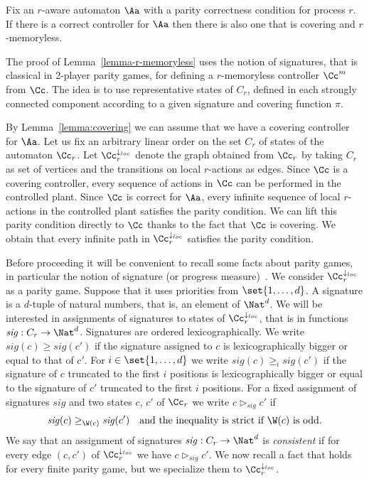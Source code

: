 \documentclass[10pt,a4paper]{article}
\newcommand{\sgt}{\vartriangleright_\sig}
\newcommand{\Ccloc}{\Cc^{\dar_{loc}}}
\newcommand{\sig}{\mathit{sig}}
\newcommand{\dar}{\downarrow}
\begin{document}
\begin{lemma}\label{lemma-r-memoryless}
  Fix an $r$-aware automaton $\Aa$ with a parity correctness condition
  for process $r$. 
  If there is a correct controller for $\Aa$ then there is
  also one that is covering and $r$-memoryless.
\end{lemma}




The proof of Lemma~\ref{lemma-r-memoryless} uses the notion of
  signatures, that is classical in 2-player parity games, for defining
  a $r$-memoryless controller $\Cc^m$ from $\Cc$. The idea is to use
  representative states of $C_r$, defined in each strongly connected
  component according to a given signature and covering function
  $\pi$.

By Lemma~\ref{lemma:covering} we can assume that we have a covering
controller for $\Aa$. Let us fix an arbitrary
linear order on the set $C_r$ of states of the automaton $\Cc_r$. Let
$\Ccloc_r$ denote the graph obtained from $\Cc_r$ by taking $C_r$ as
set of vertices and the transitions on local $r$-actions as
edges. Since $\Cc$ is a covering controller, every sequence of actions
in $\Cc$ can be performed in the controlled plant. Since $\Cc$ is
correct for $\Aa$, every
infinite sequence of local $r$-actions in the controlled plant
satisfies the parity condition. We can lift this parity condition
directly to $\Cc$ thanks to the fact that $\Cc$ is covering. We obtain
that every infinite path in $\Ccloc_r$ satisfies the parity condition.

  Before proceeding it will be convenient to recall some facts about
  parity games, in particular the notion of
  signature (or progress measure)~\cite{wal01ic}. We consider $\Ccloc_r$ as a
  parity game. Suppose that it uses priorities from
  $\set{1,\dots,d}$. A signature is a $d$-tuple of natural numbers,
  that is, an element of $\Nat^d$. We will be interested in
  assignments of signatures to states of $\Ccloc_r$, that is in
  functions $\sig:C_r\to\Nat^d$. Signatures are ordered
  lexicographically. We write $\sig(c)\geq \sig(c')$ if the signature
  assigned to $c$ is lexicographically bigger or equal to that of
  $c'$. For $i\in\set{1,\dots,d}$ we write $\sig(c)\geq_i \sig(c')$ if
  the signature of $c$ truncated to the first $i$ positions is
  lexicographically bigger or equal to the signature of $c'$ truncated
  to the first $i$ positions.  For a fixed assignment of signatures
  $\sig$ and two states $c$, $c'$ of $\Cc_r$ we write $c\sgt c'$ if
  \begin{equation*}
    \sig(c)\geq_{\W(c)} \sig(c')\quad\text{and the inequality is strict
      if $\W(c)$ is odd.}
  \end{equation*}
  We say that an assignment of signatures $\sig:C_r\to\Nat^d$ is
  \emph{consistent} if for every edge $(c,c')$ of $\Ccloc_r$ we have
  $c\sgt c'$. We now recall a fact that holds for every finite
  parity game, but we specialize them to $\Ccloc_r$.
\end{document}

